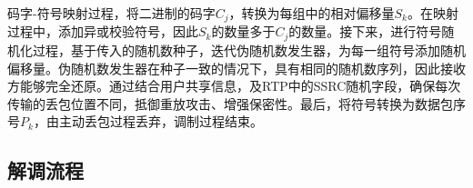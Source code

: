 码字-符号映射过程，将二进制的码字$C_{j}$，转换为每组中的相对偏移量$S_{k}$。在映射过程中，添加异或校验符号，因此$S_{k}$的数量多于$C_{j}$的数量。接下来，进行符号随机化过程，基于传入的随机数种子，迭代伪随机数发生器，为每一组符号添加随机偏移量。伪随机数发生器在种子一致的情况下，具有相同的随机数序列，因此接收方能够完全还原。通过结合用户共享信息，及RTP中的SSRC随机字段，确保每次传输的丢包位置不同，抵御重放攻击、增强保密性。最后，将符号转换为数据包序号$P_{k}$，由主动丢包过程丢弃，调制过程结束。

\subsection{解调流程}
\label{chap:hash:designation:demodulation}


